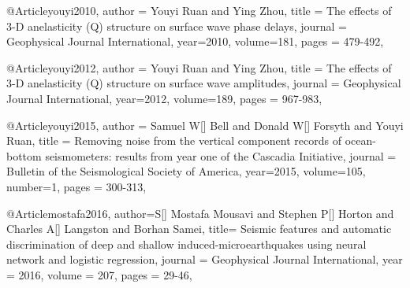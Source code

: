 @Article{youyi2010,
  author =	 {Youyi Ruan and Ying Zhou},
  title =	 {The effects of 3-D anelasticity (Q) structure on surface wave phase delays},
  journal =	 {Geophysical Journal International},
  year=2010,
  volume=181,
  pages =	 {479-492},
}

@Article{youyi2012,
  author =	 {Youyi Ruan and Ying Zhou},
  title =	 {The effects of 3-D anelasticity (Q) structure on surface wave amplitudes},
  journal =	 {Geophysical Journal International},
  year=2012,
  volume=189,
  pages =	 {967-983},
}

@Article{youyi2015,
  author =	 {Samuel W[] Bell and Donald W[] Forsyth and Youyi Ruan},
  title =	 {Removing noise from the vertical component records of ocean-bottom seismometers: results from year one of the Cascadia Initiative},
  journal =	 {Bulletin of the Seismological Society of America},
  year=2015,
  volume=105,
  number=1,
  pages =	 {300-313},
}


@Article{mostafa2016,
  author={S[] Mostafa Mousavi and Stephen P[] Horton and Charles A[] Langston and Borhan Samei},
  title={ Seismic features and automatic discrimination of deep and shallow induced-microearthquakes using neural network and logistic regression},
  journal = 	 {Geophysical Journal International},
  year = 	 2016,
  volume =	 207,
  pages =	 {29-46},
}



